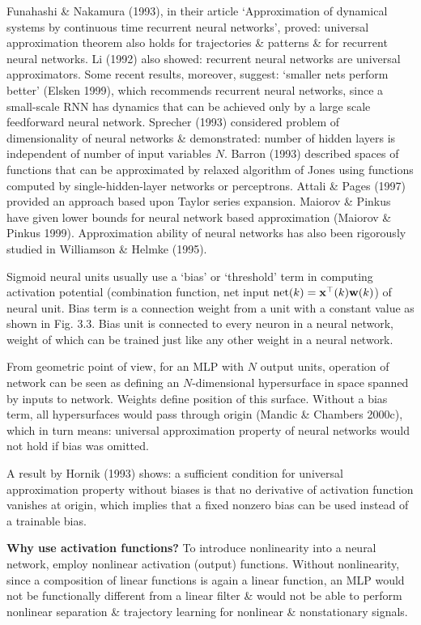 \documentclass{article}
\begin{document}
\begin{enumerate}
\begin{itemize}
\begin{itemize}
			Funahashi \& Nakamura (1993), in their article `Approximation of dynamical systems by continuous time recurrent neural networks', proved: universal approximation theorem also holds for trajectories \& patterns \& for recurrent neural networks. Li (1992) also showed: recurrent neural networks are universal approximators. Some recent results, moreover, suggest: `smaller nets perform better' (Elsken 1999), which recommends recurrent neural networks, since a small-scale RNN has dynamics that can be achieved only by a large scale feedforward neural network. Sprecher (1993) considered problem of dimensionality of neural networks \& demonstrated: number of hidden layers is independent of number of input variables $N$. Barron (1993) described spaces of functions that can be approximated by relaxed algorithm of Jones using functions computed by single-hidden-layer networks or perceptrons. Attali \& Pages (1997) provided an approach based upon Taylor series expansion. Maiorov \& Pinkus have given lower bounds for neural network based approximation (Maiorov \& Pinkus 1999). Approximation ability of neural networks has also been rigorously studied in Williamson \& Helmke (1995).
			
			Sigmoid neural units usually use a `bias' or `threshold' term in computing activation potential (combination function, net input ${\rm net}(k) = {\bf x}^\top(k){\bf w}(k)$) of neural unit. Bias term is a connection weight from a unit with a constant value as shown in Fig. 3.3. Bias unit is connected to every neuron in a neural network, weight of which can be trained just like any other weight in a neural network.
			
			From geometric point of view, for an MLP with $N$ output units, operation of network can be seen as defining an $N$-dimensional hypersurface in space spanned by inputs to network. Weights define position of this surface. Without a bias term, all hypersurfaces would pass through origin (Mandic \& Chambers 2000c), which in turn means: universal approximation property of neural networks would not hold if bias was omitted.
			
			A result by Hornik (1993) shows: a sufficient condition for universal approximation property without biases is that no derivative of activation function vanishes at origin, which implies that a fixed nonzero bias can be used instead of a trainable bias.
			
			{\bf Why use activation functions?} To introduce nonlinearity into a neural network, employ nonlinear activation (output) functions. Without nonlinearity, since a composition of linear functions is again a linear function, an MLP would not be functionally different from a linear filter \& would not be able to perform nonlinear separation \& trajectory learning for nonlinear \& nonstationary signals.
			

\end{itemize}
\end{itemize}
\end{enumerate}
\end{document}
